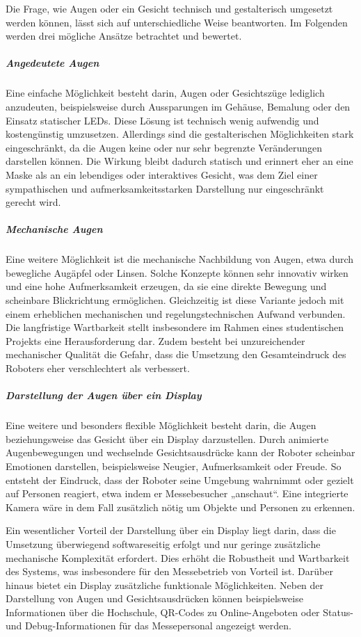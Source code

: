 Die Frage, wie Augen oder ein Gesicht technisch und gestalterisch umgesetzt werden können, lässt sich auf unterschiedliche Weise beantworten. Im Folgenden werden drei mögliche Ansätze betrachtet und bewertet.

\subparagraph{Angedeutete Augen}
Eine einfache Möglichkeit besteht darin, Augen oder Gesichtszüge lediglich anzudeuten, beispielsweise durch Aussparungen im Gehäuse, Bemalung oder den Einsatz statischer LEDs. Diese Lösung ist technisch wenig aufwendig und kostengünstig umzusetzen. Allerdings sind die gestalterischen Möglichkeiten stark eingeschränkt, da die Augen keine oder nur sehr begrenzte Veränderungen darstellen können. Die Wirkung bleibt dadurch statisch und erinnert eher an eine Maske als an ein lebendiges oder interaktives Gesicht, was dem Ziel einer sympathischen und aufmerksamkeitsstarken Darstellung nur eingeschränkt gerecht wird.

\subparagraph{Mechanische Augen}
Eine weitere Möglichkeit ist die mechanische Nachbildung von Augen, etwa durch bewegliche Augäpfel oder Linsen. Solche Konzepte können sehr innovativ wirken und eine hohe Aufmerksamkeit erzeugen, da sie eine direkte Bewegung und scheinbare Blickrichtung ermöglichen. Gleichzeitig ist diese Variante jedoch mit einem erheblichen mechanischen und regelungstechnischen Aufwand verbunden. Die langfristige Wartbarkeit stellt insbesondere im Rahmen eines studentischen Projekts eine Herausforderung dar. Zudem besteht bei unzureichender mechanischer Qualität die Gefahr, dass die Umsetzung den Gesamteindruck des Roboters eher verschlechtert als verbessert. 

\subparagraph{Darstellung der Augen über ein Display}
Eine weitere und besonders flexible Möglichkeit besteht darin, die Augen beziehungsweise das Gesicht über ein Display darzustellen. Durch animierte Augenbewegungen und wechselnde Gesichtsausdrücke kann der Roboter scheinbar Emotionen darstellen, beispielsweise Neugier, Aufmerksamkeit oder Freude. So entsteht der Eindruck, dass der Roboter seine Umgebung wahrnimmt oder gezielt auf Personen reagiert, etwa indem er Messebesucher „anschaut“. Eine integrierte Kamera wäre in dem Fall zusätzlich nötig um Objekte und Personen zu erkennen.

Ein wesentlicher Vorteil der Darstellung über ein Display liegt darin, dass die Umsetzung überwiegend softwareseitig erfolgt und nur geringe zusätzliche mechanische Komplexität erfordert. Dies erhöht die Robustheit und Wartbarkeit des Systems, was insbesondere für den Messebetrieb von Vorteil ist. Darüber hinaus bietet ein Display zusätzliche funktionale Möglichkeiten. Neben der Darstellung von Augen und Gesichtsausdrücken können beispielsweise Informationen über die Hochschule, QR-Codes zu Online-Angeboten oder Status- und Debug-Informationen für das Messepersonal angezeigt werden.

